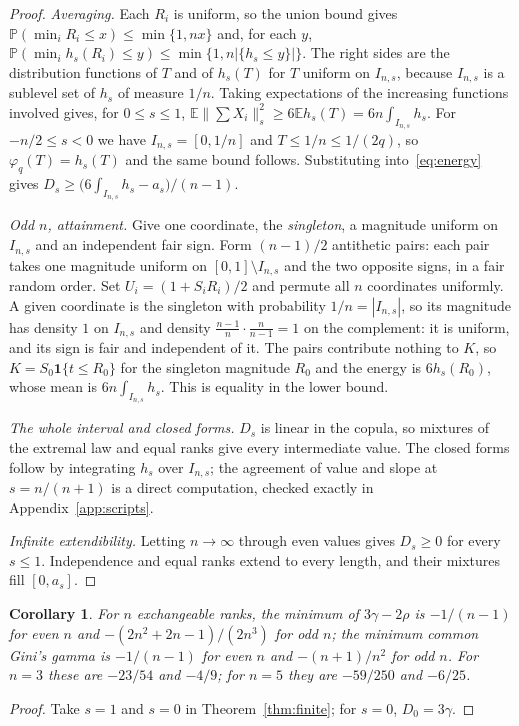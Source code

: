 \documentclass[11pt,a4paper]{article}
\newtheorem{corollary}[theorem]{Corollary}
\theoremstyle{remark}
\newcommand{\EE}{\mathbb{E}}
\newcommand{\PP}{\mathbb{P}}
\newcommand{\ind}{\mathbf 1}
\begin{document}
\begin{proof}
\emph{Averaging.} Each $R_i$ is uniform, so the union bound gives $\PP(\min_iR_i\leq x)\leq\min\{1,nx\}$ and, for each $y$, $\PP(\min_ih_s(R_i)\leq y)\leq\min\{1,n|\{h_s\leq y\}|\}$. The right sides are the distribution functions of $T$ and of $h_s(T)$ for $T$ uniform on $I_{n,s}$, because $I_{n,s}$ is a sublevel set of $h_s$ of measure $1/n$. Taking expectations of the increasing functions involved gives, for $0\leq s\leq1$, $\EE\|\sum X_i\|_s^2\geq6\EE h_s(T)=6n\int_{I_{n,s}}h_s$. For $-n/2\leq s<0$ we have $I_{n,s}=[0,1/n]$ and $T\leq1/n\leq1/(2q)$, so $\varphi_q(T)=h_s(T)$ and the same bound follows. Substituting into~\eqref{eq:energy} gives $D_s\geq\big(6\int_{I_{n,s}}h_s-a_s\big)/(n-1)$.

\emph{Odd $n$, attainment.} Give one coordinate, the \emph{singleton}, a magnitude uniform on $I_{n,s}$ and an independent fair sign. Form $(n-1)/2$ antithetic pairs: each pair takes one magnitude uniform on $[0,1]\setminus I_{n,s}$ and the two opposite signs, in a fair random order. Set $U_i=(1+S_iR_i)/2$ and permute all $n$ coordinates uniformly. A given coordinate is the singleton with probability $1/n=|I_{n,s}|$, so its magnitude has density $1$ on $I_{n,s}$ and density $\frac{n-1}{n}\cdot\frac{n}{n-1}=1$ on the complement: it is uniform, and its sign is fair and independent of it. The pairs contribute nothing to $K$, so $K=S_0\ind\{t\leq R_0\}$ for the singleton magnitude $R_0$ and the energy is $6h_s(R_0)$, whose mean is $6n\int_{I_{n,s}}h_s$. This is equality in the lower bound.

\emph{The whole interval and closed forms.} $D_s$ is linear in the copula, so mixtures of the extremal law and equal ranks give every intermediate value. The closed forms follow by integrating $h_s$ over $I_{n,s}$; the agreement of value and slope at $s=n/(n+1)$ is a direct computation, checked exactly in Appendix~\ref{app:scripts}.

\emph{Infinite extendibility.} Letting $n\to\infty$ through even values gives $D_s\geq0$ for every $s\leq1$. Independence and equal ranks extend to every length, and their mixtures fill $[0,a_s]$.
\end{proof}

\begin{corollary}\label{cor:endpoint}
For $n$ exchangeable ranks, the minimum of $3\gamma-2\rho$ is $-1/(n-1)$ for even $n$ and $-(2n^2+2n-1)/(2n^3)$ for odd $n$; the minimum common Gini's gamma is $-1/(n-1)$ for even $n$ and $-(n+1)/n^2$ for odd $n$. For $n=3$ these are $-23/54$ and $-4/9$; for $n=5$ they are $-59/250$ and $-6/25$.
\end{corollary}
\begin{proof}
Take $s=1$ and $s=0$ in Theorem~\ref{thm:finite}; for $s=0$, $D_0=3\gamma$.
\end{proof}
\end{document}

